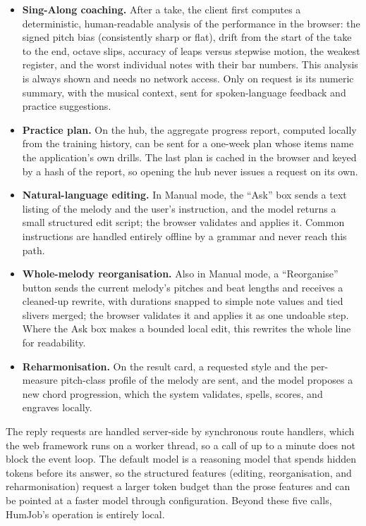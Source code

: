 \documentclass[12pt,a4paper]{article}
\begin{document}
\begin{itemize}
    \item \textbf{Sing-Along coaching.} After a take, the client first computes a
    deterministic, human-readable analysis of the performance in the browser: the
    signed pitch bias (consistently sharp or flat), drift from the start of the
    take to the end, octave slips, accuracy of leaps versus stepwise motion, the
    weakest register, and the worst individual notes with their bar numbers. This
    analysis is always shown and needs no network access. Only on request is its
    numeric summary, with the musical context, sent for spoken-language feedback
    and practice suggestions.
    \item \textbf{Practice plan.} On the hub, the aggregate progress report,
    computed locally from the training history, can be sent for a one-week plan
    whose items name the application's own drills. The last plan is cached in the
    browser and keyed by a hash of the report, so opening the hub never issues a
    request on its own.
    \item \textbf{Natural-language editing.} In Manual mode, the ``Ask'' box sends
    a text listing of the melody and the user's instruction, and the model returns
    a small structured edit script; the browser validates and applies it. Common
    instructions are handled entirely offline by a grammar and never reach this
    path.
    \item \textbf{Whole-melody reorganisation.} Also in Manual mode, a
    ``Reorganise'' button sends the current melody's pitches and beat lengths and
    receives a cleaned-up rewrite, with durations snapped to simple note values
    and tied slivers merged; the browser validates it and applies it as one
    undoable step. Where the Ask box makes a bounded local edit, this rewrites the
    whole line for readability.
    \item \textbf{Reharmonisation.} On the result card, a requested style and the
    per-measure pitch-class profile of the melody are sent, and the model proposes
    a new chord progression, which the system validates, spells, scores, and
    engraves locally.
\end{itemize}

The reply requests are handled server-side by synchronous route handlers, which
the web framework runs on a worker thread, so a call of up to a minute does not
block the event loop. The default model is a reasoning model that spends hidden
tokens before its answer, so the structured features (editing, reorganisation,
and reharmonisation) request a larger token budget than the prose features and can
be pointed at a faster model through configuration. Beyond these five calls, HumJob's
operation is entirely local.
\end{document}
